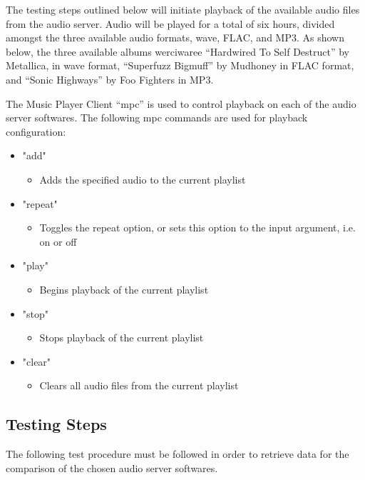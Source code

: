 \documentclass[11pt,a4paper]{scrreprt}
\begin{document}
The testing steps outlined below will initiate playback of the available
audio files from the audio server. Audio will be played for a total of
six hours, divided amongst the three available audio formats, wave,
FLAC, and MP3. As shown below, the three available albums werciwaree
``Hardwired To Self Destruct'' by Metallica, in wave format, ``Superfuzz
Bigmuff'' by Mudhoney in FLAC format, and ``Sonic Highways'' by Foo
Fighters in MP3.

The Music Player Client ``mpc'' is used to control playback on each of
the audio server softwares. The following mpc commands are used for
playback configuration:

\begin{itemize}
 \item "add"
 \begin{itemize}
  \item Adds the specified audio to the current playlist
 \end{itemize}
 \item "repeat"
 \begin{itemize}
  \item Toggles the repeat option, or sets this option to the input argument, i.e. on
   or off
  \end{itemize}
 \item "play"
 \begin{itemize}
  \item Begins playback of the current playlist
 \end{itemize}
 \item "stop"
 \begin{itemize}
  \item Stops playback of the current playlist
 \end{itemize}
 \item "clear"
 \begin{itemize}
  \item Clears all audio files from the current playlist
 \end{itemize}
\end{itemize}

\subsection{Testing Steps}\label{testing-steps}

The following test procedure must be followed in order to retrieve data
for the comparison of the chosen audio server softwares.
\end{document}
